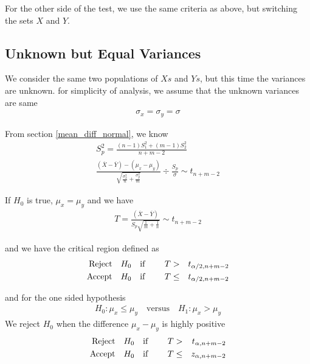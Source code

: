 \documentclass[../probability-notes.tex]{subfiles}
\begin{document}
    For the other side of the test, we use the same criteria as above, but switching the sets $X$ and $Y$.

    
    \subsection{Unknown but Equal Variances}
    We consider the same two populations of $Xs$ and $Ys$, but this time the variances are unknown. for simplicity of analysis, we assume that the unknown variances are same
    \begin{align*}
        \sigma_{x} = \sigma_{y} = \sigma
    \end{align*}

    From section \ref{mean_diff_normal}, we know
    \begin{align*}
        S_{p}^{2} = \frac{(n-1)S_{1}^{2} + (m-1)S_{2}^{2}}{n + m - 2}\\
        \frac{(\overline{X} - \overline{Y}) - (\mu_{x} - \mu_{y})}{\sqrt{\frac{\sigma_{x}^{2}}{n} + \frac{\sigma_{y}^{2}}{m}}} \div \frac{S_{p}}{\sigma} \sim t_{n+m-2}
    \end{align*}

    If $H_{0}$ is true, $\mu_{x} = \mu_{y}$ and we have
    \begin{align*}
        T = \frac{(\overline{X} - \overline{Y})}{S_{p}\sqrt{\frac{1}{m} + \frac{1}{n}}} \sim t_{n+m-2}
    \end{align*}

    and we have the critical region defined as
    \begin{alignat*}{4}
        \text{Reject\quad} &H_{0} \text{\quad if \quad} &T &> &t_{\alpha/2, n+m-2}\\
        \text{Accept\quad} &H_{0} \text{\quad if\quad} &T &\leq &t_{\alpha/2, n+m-2}
    \end{alignat*}

    and for the one sided hypothesis
    \begin{align*}
        H_{0}: \mu_{x} \leq \mu_{y} \quad \text{versus} \quad H_{1}: \mu_{x} > \mu_{y}
    \end{align*}
    We reject $H_{0}$ when the difference $\mu_{x} - \mu_{y}$ is highly positive
    \begin{alignat*}{4}
        \text{Reject\quad} &H_{0} \text{\quad if \quad} &T &> &t_{\alpha, n+m-2}\\
        \text{Accept\quad} &H_{0} \text{\quad if\quad} &T &\leq &z_{\alpha, n+m-2}
    \end{alignat*}    
\end{document}
